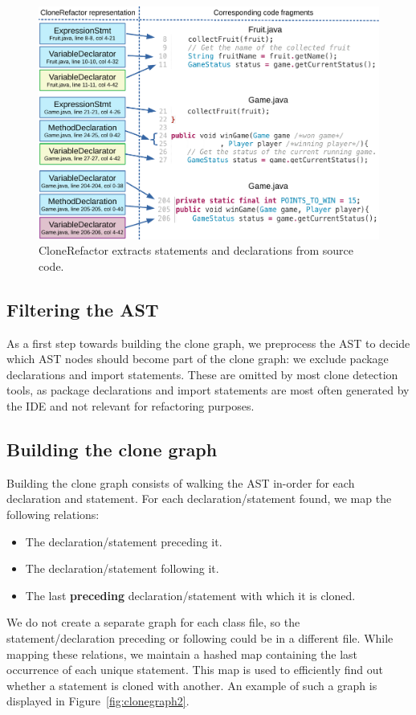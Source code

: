 \documentclass[journal]{IEEEtran}
\begin{document}
\begin{figure}
  \centering
  \includegraphics[width=1\textwidth]{img/CloneGraphCode}
  \caption{CloneRefactor extracts statements and declarations from source code.}
  \label{fig:clonegraph}
\end{figure}

\subsection{Filtering the AST}
As a first step towards building the clone graph, we preprocess the AST to decide which AST nodes should become part of the clone graph: we exclude package declarations and import statements. These are omitted by most clone detection tools, as package declarations and import statements are most often generated by the IDE and not relevant for refactoring purposes.

\subsection{Building the clone graph}\label{sec:buildingclonegraph}
Building the clone graph consists of walking the AST in-order for each declaration and statement. For each declaration/statement found, we map the following relations:
\begin{itemize}
  \item The declaration/statement preceding it.
  \item The declaration/statement following it.
  \item The last \textbf{preceding} declaration/statement with which it is cloned.
\end{itemize}
We do not create a separate graph for each class file, so the statement/declaration preceding or following could be in a different file. While mapping these relations, we maintain a hashed map containing the last occurrence of each unique statement. This map is used to efficiently find out whether a statement is cloned with another. An example of such a graph is displayed in Figure~\ref{fig:clonegraph2}.
\end{document}
